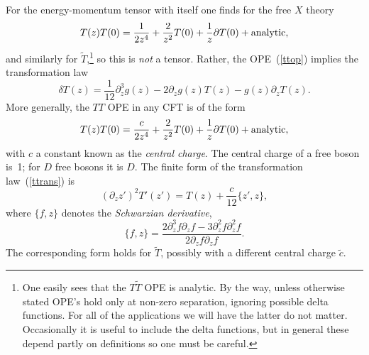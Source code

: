 For the energy-momentum tensor with itself one finds for the free
$X$ theory
\begin{equation}
T(z) T(0) = \frac{1}{2 z^4} + \frac{2}{z^2} T(0) + \frac{1}{z}
\partial T(0) + {\rm analytic}, \label{ttop}
\end{equation}
and similarly for $\tilde T$,\footnote
{One easily sees that the $T \tilde T$ OPE is analytic.
By the way, unless otherwise stated OPE's hold only at non-zero
separation, ignoring possible delta functions.  For all of the
applications we will have the latter do not matter.  Occasionally it
is useful to include the delta functions, but in general these depend
partly on definitions so one must be careful.}
so this is {\it not} a tensor.  Rather, the OPE~(\ref{ttop})
implies the transformation law
\begin{equation}
\delta T(z) = \frac{1}{12} \partial^3_z g(z) - 2 \partial_z g(z)
T(z) - g(z) \partial_z T(z). \label{ttrans}
\end{equation}
More generally, the $TT$ OPE in any CFT is of the form
\begin{equation}
T(z) T(0) = \frac{c}{2 z^4} + \frac{2}{z^2} T(0) + \frac{1}{z}
\partial T(0) + {\rm analytic}, \label{ttop2}
\end{equation}
with $c$ a constant known as the {\it central charge}. 
The central charge of a free boson is~1; for $D$ free
bosons it is $D$.  The finite form of the transformation
law~(\ref{ttrans}) is
\begin{equation}
(\partial_z z')^2 T'(z') = T(z) + \frac{c}{12} \{ z',z\} ,
\label{ttra}
\end{equation}
where $\{ f, z\} $ denotes the {\it Schwarzian derivative},
\begin{equation}
\{ f,z \} = \frac{2 \partial_z^3 f \partial_z f 
- 3 \partial_z^2 f \partial_z^2 f}{2\partial_z f \partial_z f}.
\label{schw}
\end{equation}
The corresponding form holds for $\tilde T$,
possibly with a different central charge $\tilde c$.


